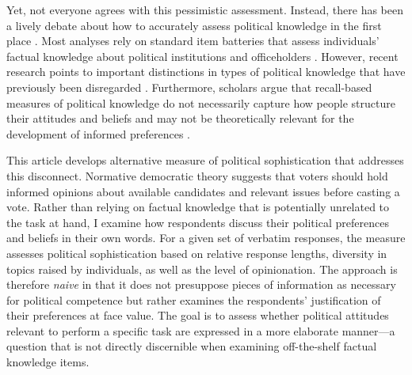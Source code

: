 \documentclass[12pt]{article}
\begin{document}
Yet, not everyone agrees with this pessimistic assessment. Instead, there has been a lively debate about how to accurately assess political knowledge in the first place \citep[e.g.][]{mondak2000reconsidering,mondak2001asked,sturgis2008experiment,debell2013harder,pietryka2013analysis}. Most analyses rely on standard item batteries that assess individuals' factual knowledge about political institutions and officeholders \citep[e.g.,][]{carpini1996americans}. However, recent research points to important distinctions in types of political knowledge that have previously been disregarded \citep{barabas2014question}. Furthermore, scholars argue that recall-based measures of political knowledge do not necessarily capture how people structure their attitudes and beliefs \citep[e.g.,][]{luskin1987measuring} and may not be theoretically relevant for the development of informed preferences \citep[e.g.,][]{lupia2006elitism,gilens2001political}.


This article develops alternative measure of political sophistication that addresses this disconnect. Normative democratic theory suggests that voters should hold informed opinions about available candidates and relevant issues before casting a vote. Rather than relying on factual knowledge that is potentially unrelated to the task at hand, I examine how respondents discuss their political preferences and beliefs in their own words. For a given set of verbatim responses, the measure assesses political sophistication based on relative response lengths, diversity in topics raised by individuals, as well as the level of opinionation. The approach is therefore \textit{naive} in that it does not presuppose pieces of information as necessary for political competence but rather examines the respondents' justification of their preferences at face value. The goal is to assess whether political attitudes relevant to perform a specific task are expressed in a more elaborate manner---a question that is not directly discernible when examining off-the-shelf factual knowledge items. %
\end{document}
